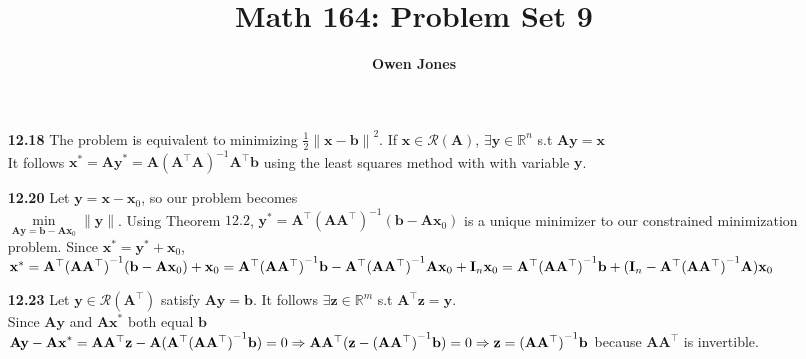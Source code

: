 \documentclass[10pt]{article}
\title{\bf Math 164: Problem Set 9}
\author{\bf Owen Jones}
\begin{document}
\maketitle
\begin{enumerate}
    \item [\textbf{12.18}] The problem is equivalent to minimizing $\frac{1}{2}{\lVert \mathbf{x}-\mathbf{b}\rVert}^2$. 
    If $\mathbf{x}\in \mathcal{R}(\mathbf{A})$, $\exists \mathbf{y}\in\mathbb{R}^n$ s.t $\mathbf{Ay}=\mathbf{x}$\\
    It follows $\mathbf{x}^*=\mathbf{Ay}^*=\mathbf{A}{(\mathbf{A}^\top\mathbf{A})}^{-1}\mathbf{A}^\top\mathbf{b}$ using the least squares method with with variable $\mathbf{y}$.
    \item [\textbf{12.20}] Let $\mathbf{y}=\mathbf{x}-\mathbf{x}_0$, so our problem becomes\\
    $\underset{\mathbf{Ay}=\mathbf{b}-\mathbf{Ax}_0}{\min}\lVert \mathbf{y}\rVert$.
    Using Theorem $12.2$, $\mathbf{y}^*=\mathbf{A}^\top{(\mathbf{A}\mathbf{A}^\top)}^{-1}(\mathbf{b}-\mathbf{Ax}_0)$ is a unique minimizer to our constrained minimization problem.
    Since $\mathbf{x}^*=\mathbf{y}^*+\mathbf{x}_0$,\\ 
    $\mathbf{x}^*=\mathbf{A}^\top{(\mathbf{A}\mathbf{A}^\top)}^{-1}(\mathbf{b}-\mathbf{Ax}_0)+\mathbf{x}_0\\
    =\mathbf{A}^\top{(\mathbf{A}\mathbf{A}^\top)}^{-1}\mathbf{b}-\mathbf{A}^\top{(\mathbf{A}\mathbf{A}^\top)}^{-1}\mathbf{Ax}_0+\mathbf{I}_n\mathbf{x}_0\\
    =\mathbf{A}^\top{(\mathbf{A}\mathbf{A}^\top)}^{-1}\mathbf{b}+(\mathbf{I}_n-\mathbf{A}^\top{(\mathbf{A}\mathbf{A}^\top)}^{-1}\mathbf{A})\mathbf{x}_0$
    \item [\textbf{12.23}] Let $\mathbf{y}\in \mathcal{R}(\mathbf{A}^\top)$ satisfy $\mathbf{Ay}=\mathbf{b}$. 
    It follows $\exists \mathbf{z}\in\mathbb{R}^m$ s.t $\mathbf{A}^\top\mathbf{z}=\mathbf{y}$.\\
    Since $\mathbf{Ay}$ and $\mathbf{Ax}^*$ both equal $\mathbf{b}$\\
    $\mathbf{Ay}-\mathbf{Ax}^*=\mathbf{A}\mathbf{A}^\top\mathbf{z}-\mathbf{A}(\mathbf{A}^\top{(\mathbf{A}\mathbf{A}^\top)}^{-1}\mathbf{b})=0\\
    \Rightarrow \mathbf{A}\mathbf{A}^\top(\mathbf{z}-{(\mathbf{A}\mathbf{A}^\top)}^{-1}\mathbf{b})=0\\
    \Rightarrow \mathbf{z}={(\mathbf{A}\mathbf{A}^\top)}^{-1}\mathbf{b}$ because $\mathbf{A}\mathbf{A}^\top$ is invertible.\\

\end{enumerate}
\end{document}
